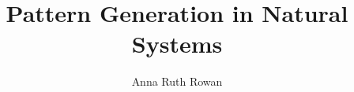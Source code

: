 \documentclass[a4paper,10pt]{scrreprt}
\title{Pattern Generation in Natural Systems}
\author{Anna Ruth Rowan}
\begin{document}
\maketitle


\begin{abstract}
\end{abstract}










\end{document}

